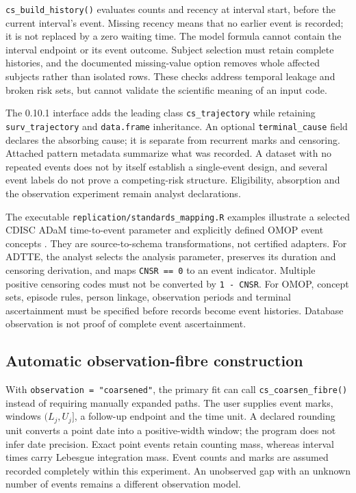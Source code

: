 \documentclass[article,nojss]{jss}
\newcommand{\code}[1]{\texttt{#1}}
\begin{document}
\code{cs\_build\_history()} evaluates counts and recency at interval start, before the current interval's event. Missing recency means that no earlier event is recorded; it is not replaced by a zero waiting time. The model formula cannot contain the interval endpoint or its event outcome. Subject selection must retain complete histories, and the documented missing-value option removes whole affected subjects rather than isolated rows. These checks address temporal leakage and broken risk sets, but cannot validate the scientific meaning of an input code.

The 0.10.1 interface adds the leading class \code{cs\_trajectory} while retaining \code{surv\_trajectory} and \code{data.frame} inheritance. An optional \code{terminal\_cause} field declares the absorbing cause; it is separate from recurrent marks and censoring. Attached pattern metadata summarize what was recorded. A dataset with no repeated events does not by itself establish a single-event design, and several event labels do not prove a competing-risk structure. Eligibility, absorption and the observation experiment remain analyst declarations.

\begin{samepage}
The executable \code{replication/standards\_mapping.R} examples illustrate a selected CDISC ADaM time-to-event parameter and explicitly defined OMOP event concepts \citep{CDISCTTE,CDISCExample,OMOP54}. They are source-to-schema transformations, not certified adapters. For ADTTE, the analyst selects the analysis parameter, preserves its duration and censoring derivation, and maps \code{CNSR == 0} to an event indicator. Multiple positive censoring codes must not be converted by \code{1 - CNSR}. For OMOP, concept sets, episode rules, person linkage, observation periods and terminal ascertainment must be specified before records become event histories. Database observation is not proof of complete event ascertainment.

\end{samepage}


\subsection{Automatic observation-fibre construction}
With \code{observation = "coarsened"}, the primary fit can call \code{cs\_coarsen\_fibre()} instead of requiring manually expanded paths. The user supplies event marks, windows $(L_j,U_j]$, a follow-up endpoint and the time unit. A declared rounding unit converts a point date into a positive-width window; the program does not infer date precision. Exact point events retain counting mass, whereas interval times carry Lebesgue integration mass. Event counts and marks are assumed recorded completely within this experiment. An unobserved gap with an unknown number of events remains a different observation model.
\end{document}
